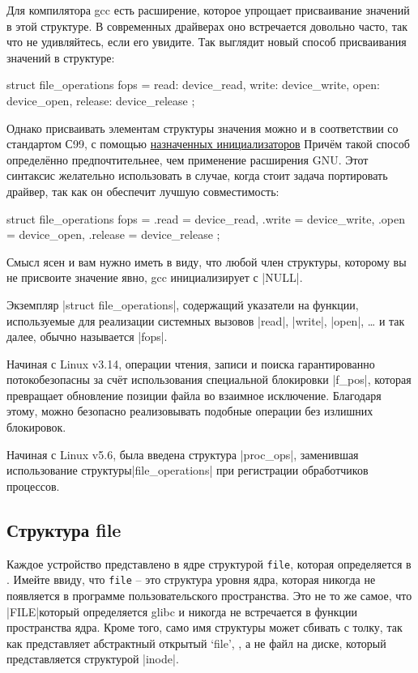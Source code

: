 \documentclass[10pt, oneside]{book}
\begin{document}
Для компилятора gcc есть расширение, которое упрощает присваивание значений в этой структуре. В современных драйверах оно встречается довольно часто, так что не удивляйтесь, если его увидите.
Так выглядит новый способ присваивания значений в структуре:

\begin{code}
struct file_operations fops = {
	read: device_read,
	write: device_write,
	open: device_open,
	release: device_release
};
\end{code}

Однако присваивать элементам структуры значения можно и в соответствии со стандартом С99, с помощью \href{https://gcc.gnu.org/onlinedocs/gcc/Designated-Inits.html}{назначенных инициализаторов} Причём такой способ определённо предпочтительнее, чем применение расширения GNU. Этот синтаксис желательно использовать в случае, когда стоит задача портировать драйвер, так как он обеспечит лучшую совместимость:

\begin{code}
struct file_operations fops = {
	.read = device_read,
	.write = device_write,
	.open = device_open,
	.release = device_release
};
\end{code}

Смысл ясен и вам нужно иметь в виду, что любой член структуры, которому вы не присвоите значение явно, gcc инициализирует с \cpp|NULL|.

Экземпляр \cpp|struct file_operations|, содержащий указатели на функции, используемые для реализации системных вызовов \cpp|read|, \cpp|write|, \cpp|open|, \ldots{} и так далее, обычно называется \cpp|fops|.

Начиная с Linux v3.14, операции чтения, записи и поиска гарантированно потокобезопасны за счёт использования специальной блокировки \cpp|f_pos|, которая превращает обновление позиции файла во взаимное исключение. Благодаря этому, можно безопасно реализовывать подобные операции без излишних блокировок.

Начиная с Linux v5.6, была введена структура \cpp|proc_ops|, заменившая использование структуры\cpp|file_operations| при регистрации обработчиков процессов.

\subsection{Структура file}
\label{sec:file_struct}

Каждое устройство представлено в ядре структурой \verb|file|, которая определяется в .
Имейте ввиду, что \verb|file| – это структура уровня ядра, которая никогда не
появляется в программе пользовательского пространства. Это не то же самое, что \cpp|FILE|который определяется glibc и никогда не встречается в функции пространства ядра. Кроме того, само имя структуры может сбивать с толку, так как представляет абстрактный
открытый `file', , а не файл на диске, который представляется структурой \cpp|inode|.
\end{document}
